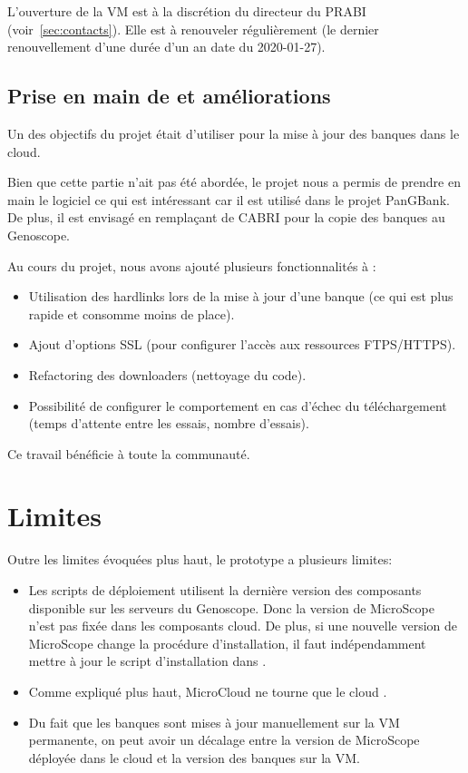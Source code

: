 \begin{warningbox}
    L'ouverture de la VM est à la discrétion du directeur du PRABI (voir~\autoref{sec:contacts}).
    Elle est à renouveler régulièrement (le dernier renouvellement d'une durée d'un an date du 2020-01-27).
\end{warningbox}

\subsection{Prise en main de  et améliorations}\label{subsec:biomaj}

Un des objectifs du projet était d'utiliser  pour la mise à jour des banques dans le cloud.

Bien que cette partie n'ait pas été abordée, le projet nous a permis de prendre en main le logiciel
ce qui est intéressant car il est utilisé dans le projet PanGBank.
De plus, il est envisagé en remplaçant de CABRI pour la copie des banques au Genoscope.

Au cours du projet, nous avons ajouté plusieurs fonctionnalités à :
\begin{itemize}
    \item Utilisation des hardlinks lors de la mise à jour d'une banque (ce qui est plus rapide et consomme moins de place).
    \item Ajout d'options SSL (pour configurer l'accès aux ressources FTPS/HTTPS).
    \item Refactoring des downloaders (nettoyage du code).
    \item Possibilité de configurer le comportement en cas d'échec du téléchargement (temps d'attente entre les essais, nombre d'essais).
\end{itemize}

Ce travail bénéficie à toute la communauté.

\section{Limites}

Outre les limites évoquées plus haut, le prototype a plusieurs limites:
\begin{itemize}
    \item Les scripts de déploiement utilisent la dernière version des composants disponible sur les serveurs du Genoscope.
          Donc la version de MicroScope n'est pas fixée dans les composants cloud.
          De plus, si une nouvelle version de MicroScope change la procédure d'installation,
          il faut indépendamment mettre à jour le script d'installation dans .
    \item Comme expliqué plus haut, MicroCloud ne tourne que le cloud .
    \item Du fait que les banques sont mises à jour manuellement sur la VM permanente, on peut avoir un décalage entre la version de MicroScope déployée dans le cloud
          et la version des banques sur la VM.
\end{itemize}

